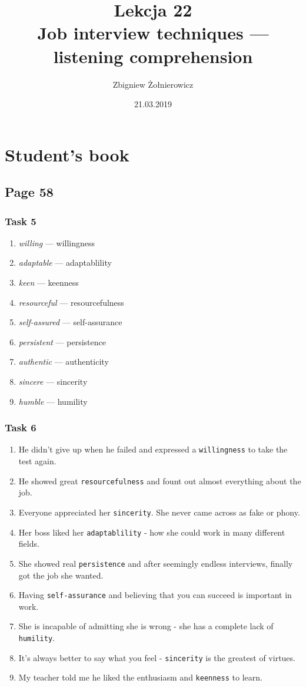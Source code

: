 \documentclass[a4paper]{article}
\begin{document}
\title{{\huge Lekcja 22} \\
{\large Job interview techniques --- listening comprehension}}
\author{Zbigniew Żołnierowicz}
\date{21.03.2019}
\maketitle
\section{Student's book}
\subsection{Page 58}
\subsubsection{Task 5}

\begin{enumerate}
    \item \emph{willing} --- willingness
    \item \emph{adaptable} --- adaptablility
    \item \emph{keen} --- keenness
    \item \emph{resourceful} --- resourcefulness
    \item \emph{self-assured} --- self-assurance
    \item \emph{persistent} --- persistence
    \item \emph{authentic} --- authenticity
    \item \emph{sincere} --- sincerity
    \item \emph{humble} --- humility
\end{enumerate}
\subsubsection{Task 6}
\begin{enumerate}
    \item He didn't give up when he failed and expressed a {\tt willingness} to take the test again.
    \item He showed great {\tt resourcefulness} and fount out almost everything about the job.
    \item Everyone appreciated her {\tt sincerity}. She never came across as fake or phony.
    \item Her boss liked her {\tt adaptablility} - how she could work in many different fields.
    \item She showed real {\tt persistence} and after seemingly endless interviews, finally got the job she wanted.
    \item Having {\tt self-assurance} and believing that you can succeed is important in work.
    \item She is incapable of admitting she is wrong - she has a complete lack of {\tt humility}.
    \item It's always better to say what you feel - {\tt sincerity} is the greatest of virtues.
    \item My teacher told me he liked the enthusiasm and {\tt keenness} to learn.
\end{enumerate}
\end{document}
